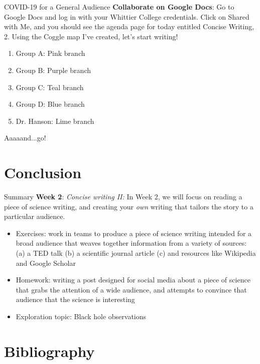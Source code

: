 \documentclass{beamer}
\begin{document}
\begin{frame}{COVID-19 for a General Audience}
\textbf{Collaborate on Google Docs}: Go to Google Docs and log in with your Whittier College credentials.  Click on Shared with Me, and you should see the agenda page for today entitled Concise Writing, 2.  Using the Coggle map I've created, let's start writing!
\begin{enumerate}
\item Group A: Pink branch
\item Group B: Purple branch
\item Group C: Teal branch
\item Group D: Blue branch
\item Dr. Hanson: Lime branch
\end{enumerate}
Aaaaand...go!
\end{frame}

\section{Conclusion}

\begin{frame}{Summary}
\textbf{Week 2}: \textit{Concise writing II:} In Week 2, we will focus on reading a piece of science writing, and creating your \textit{own} writing that tailors the story to a particular audience.
\begin{itemize}
\item Exercises: work in teams to produce a piece of science writing intended for a broad audience that weaves together information from a variety of sources: (a) a TED talk (b) a scientific journal article (c) and resources like Wikipedia and Google Scholar
\item Homework: writing a post designed for social media about a piece of science that grabs the attention of a wide audience, and attempts to convince that audience that the science is interesting
\item Exploration topic: Black hole observations
\end{itemize}
\end{frame}


\section{Bibliography}


\end{document}

